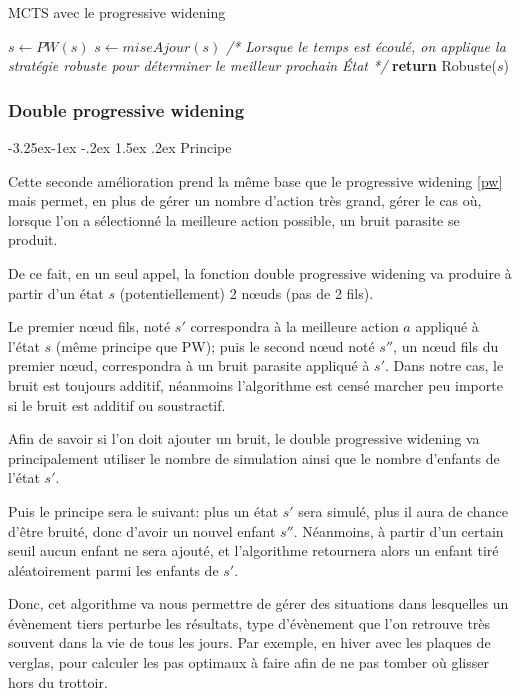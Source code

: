 \documentclass[pdftex,french, english]{article}	%
\makeatletter
\newcounter {subsubsubsection}[subsubsection]
\newcommand\subsubsubsection{\@startsection{subsubsubsection}{4}{\z@}%
                                     {-3.25ex\@plus -1ex \@minus -.2ex}%
                                     {1.5ex \@plus .2ex}%
                                     {\normalfont\normalsize\bfseries}}
\makeatother
\begin{document}
		\begin{algorithm}[H]
			\caption{MCTS avec le progressive widening}
			\label{alg:mctspw}
				\begin{algorithmic}[1]
								\State $s \gets PW(s)$ 
							\EndWhile
						\State $s \gets miseAjour(s)$
						\EndWhile
						\State \textit{/* Lorsque le temps est écoulé, on applique la stratégie robuste pour déterminer le meilleur prochain État */}
					\State \textbf{return} Robuste($s$)
					\EndFunction
				\end{algorithmic}
		\end{algorithm}
	\subsubsection{Double progressive widening} \label{dpw}
		\subsubsubsection{Principe} \label{dpw:principe}

			Cette seconde amélioration prend la même base que le progressive widening \ref{pw} mais permet, en plus de gérer un nombre d'action très grand, gérer le cas où, lorsque l'on a sélectionné la meilleure action possible, un bruit parasite se produit.

			De ce fait, en un seul appel, la fonction double progressive widening va produire à partir d'un état $s$ (potentiellement) 2 nœuds (pas de 2 fils).

			Le premier nœud fils, noté $s'$ correspondra à la meilleure action $a$ appliqué à l'état $s$ (même principe que PW); puis le second nœud noté $s''$, un nœud fils du premier nœud, correspondra à un bruit parasite appliqué à $s'$.
			Dans notre cas, le bruit est toujours additif, néanmoins l'algorithme est censé marcher peu importe si le bruit est additif ou soustractif.

			Afin de savoir si l'on doit ajouter un bruit, le double progressive widening va principalement utiliser le nombre de simulation ainsi que le nombre d'enfants de l'état $s'$.

			Puis le principe sera le suivant: plus un état $s'$ sera simulé, plus il aura de chance d'être bruité, donc d'avoir un nouvel enfant $s''$. Néanmoins, à partir d'un certain seuil aucun enfant ne sera ajouté, et l'algorithme retournera alors un enfant tiré aléatoirement parmi les enfants de $s'$.

			Donc, cet algorithme va nous permettre de gérer des situations dans lesquelles un évènement tiers perturbe les résultats, type d'évènement que l'on retrouve très souvent dans la vie de tous les jours. Par exemple, en hiver avec les plaques de verglas, pour calculer les pas optimaux à faire afin de ne pas tomber où glisser hors du trottoir.
\end{document}
